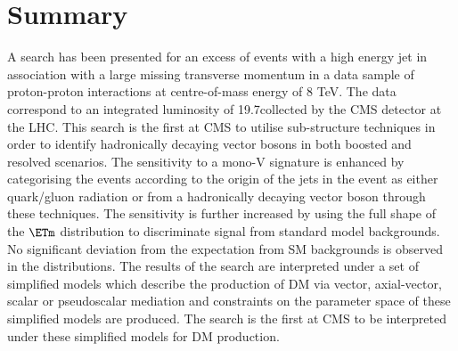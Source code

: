 \section{Summary}
A search has been presented for an excess of events with a high energy jet 
in association with a large missing transverse momentum in a data sample of 
proton-proton interactions at centre-of-mass energy of 8 TeV. The data 
correspond to an integrated luminosity of 19.7\fbinv collected by the CMS 
detector at the LHC. 
This search is the first at CMS to utilise sub-structure techniques in order to identify hadronically decaying vector 
bosons in both boosted and resolved scenarios. The sensitivity to a mono-V signature is enhanced by categorising the events 
according to the origin of the jets in the event as either quark/gluon radiation or from a hadronically decaying vector boson through these techniques.
The sensitivity is further increased by using the full shape of the $\ETm$ distribution to discriminate signal from standard model backgrounds. 
No significant deviation from the expectation from SM backgrounds is observed in the \ETm distributions.  
The results of the search are interpreted under a set of simplified models which describe the production of DM via vector, axial-vector, scalar or pseudoscalar mediation and 
constraints on the parameter space of these simplified models are produced. The search is the first at CMS to be interpreted under these simplified models for 
DM production. 
